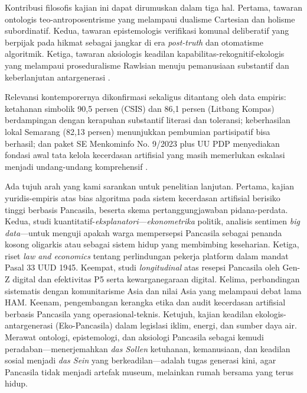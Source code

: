 \documentclass[journal]{IEEEtran}
\begin{document}
Kontribusi filosofis kajian ini dapat dirumuskan dalam tiga hal. Pertama, tawaran ontologis teo-antroposentrisme yang melampaui dualisme Cartesian dan holisme subordinatif. Kedua, tawaran epistemologis verifikasi komunal deliberatif yang berpijak pada hikmat sebagai jangkar di era \textit{post-truth} dan otomatisme algoritmik. Ketiga, tawaran aksiologis keadilan kapabilitas-rekognitif-ekologis yang melampaui proseduralisme Rawlsian menuju pemanusiaan substantif dan keberlanjutan antargenerasi \cite{rawls1971,sen1999,nussbaum2011,fraser2008,young1990,yusa2022}.

Relevansi kontemporernya dikonfirmasi sekaligus ditantang oleh data empiris: ketahanan simbolik 90,5 persen (CSIS) dan 86,1 persen (Litbang Kompas) berdampingan dengan kerapuhan substantif literasi dan toleransi; keberhasilan lokal Semarang (82,13 persen) menunjukkan pembumian partisipatif bisa berhasil; dan paket SE Menkominfo No. 9/2023 plus UU PDP menyediakan fondasi awal tata kelola kecerdasan artifisial yang masih memerlukan eskalasi menjadi undang-undang komprehensif \cite{csis2023,kompas2023,wibowo2021,kominfo2023,uupdp2022}.

Ada tujuh arah yang kami sarankan untuk penelitian lanjutan. Pertama, kajian yuridis-empiris atas bias algoritma pada sistem kecerdasan artifisial berisiko tinggi berbasis Pancasila, beserta skema pertanggungjawaban pidana-perdata. Kedua, studi kuantitatif-\textit{eksplanatori}---\textit{ekonometrika} politik, analisis sentimen \textit{big data}---untuk menguji apakah warga mempersepsi Pancasila sebagai penanda kosong oligarkis atau sebagai sistem hidup yang membimbing keseharian. Ketiga, riset \textit{law and economics} tentang perlindungan pekerja platform dalam mandat Pasal 33 UUD 1945. Keempat, studi \textit{longitudinal} atas resepsi Pancasila oleh Gen-Z digital dan efektivitas P5 serta kewarganegaraan digital. Kelima, perbandingan sistematis dengan komunitarisme Asia dan nilai Asia yang melampaui debat lama HAM. Keenam, pengembangan kerangka etika dan audit kecerdasan artifisial berbasis Pancasila yang operasional-teknis. Ketujuh, kajian keadilan ekologis-antargenerasi (Eko-Pancasila) dalam legislasi iklim, energi, dan sumber daya air. Merawat ontologi, epistemologi, dan aksiologi Pancasila sebagai kemudi peradaban---menerjemahkan \textit{das Sollen} ketuhanan, kemanusiaan, dan keadilan sosial menjadi \textit{das Sein} yang berkeadilan---adalah tugas generasi kini, agar Pancasila tidak menjadi artefak museum, melainkan rumah bersama yang terus hidup.
\end{document}
